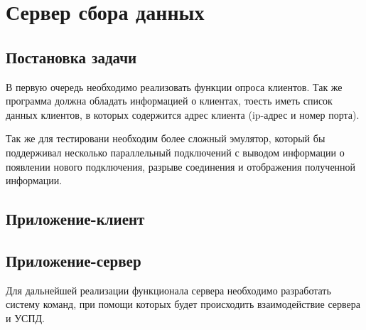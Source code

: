 \section{Сервер сбора данных}
\subsection{Постановка задачи}

В первую очередь необходимо реализовать функции опроса клиентов. Так же программа должна обладать информацией о клиентах, тоесть иметь список данных клиентов, в которых содержится адрес клиента (ip-адрес и номер порта).

Так же для тестировани необходим более сложный эмулятор, который бы поддерживал несколько параллельный подключений с выводом информации о появлении нового подключения, разрыве соединения и отображения полученной информации.

\subsection{Приложение-клиент}



\subsection{Приложение-сервер}



Для дальнейшей реализации функционала сервера необходимо разработать систему команд, при помощи которых будет происходить взаимодействие сервера и УСПД.